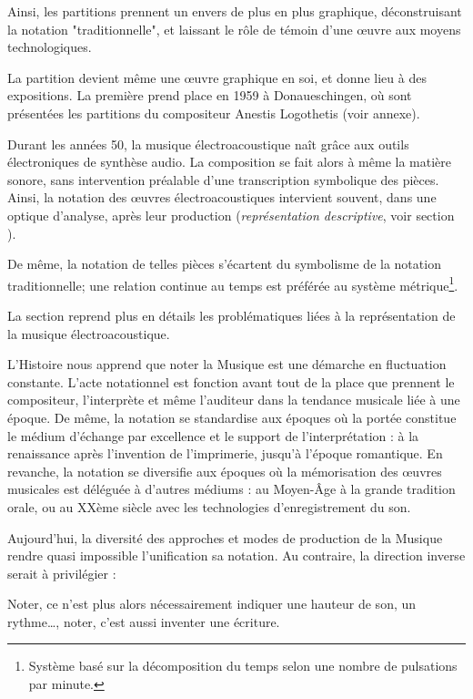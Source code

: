 Ainsi, les partitions prennent un envers de plus en plus graphique, déconstruisant la notation "traditionnelle", et laissant le rôle de témoin d'une œuvre aux moyens technologiques.

La partition devient même une œuvre graphique en soi, et donne lieu à des expositions. La première prend place en 1959 à Donaueschingen, où sont présentées les partitions du compositeur Anestis Logothetis (voir annexe).

Durant les années 50, la musique électroacoustique naît grâce aux outils électroniques de synthèse audio.
La composition se fait alors à même la matière sonore, sans intervention préalable d'une transcription symbolique des pièces.
Ainsi, la notation des œuvres électroacoustiques intervient souvent, dans une optique d'analyse, après leur production (\textit{représentation descriptive}, voir section ).

De même, la notation de telles pièces s'écartent du symbolisme de la notation traditionnelle; une relation continue au temps est préférée au système métrique\footnote{Système basé sur la décomposition du temps selon une nombre de pulsations par minute.}.

La section  reprend plus en détails les problématiques liées à la représentation de la musique électroacoustique. 

\bigskip

L'Histoire nous apprend que noter la Musique est une démarche en fluctuation constante. L'acte notationnel est fonction avant tout de la place que prennent le compositeur, l'interprète et même l'auditeur dans la tendance musicale liée à une époque.
De même, la notation se standardise aux époques où la portée constitue le médium d'échange par excellence et le support de l'interprétation : à la renaissance après l'invention de l'imprimerie, jusqu'à l'époque romantique.
En revanche, la notation se diversifie aux époques où la mémorisation des œuvres musicales est déléguée à d'autres médiums : au Moyen-Âge à la grande tradition orale, ou au XXème siècle avec les technologies d'enregistrement du son.   

Aujourd'hui, la diversité des approches et modes de production de la Musique rendre quasi impossible l'unification sa notation.
Au contraire, la direction inverse serait à privilégier :
\begin{displayquote}
\og Noter, ce n'est plus alors nécessairement indiquer une hauteur de son, un rythme…, noter, c'est aussi inventer une écriture.\fg 
\end{displayquote} 

